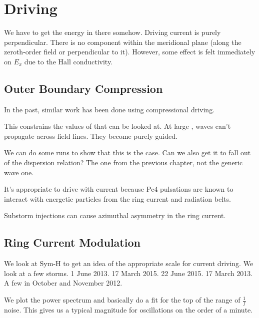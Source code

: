 \section{Driving}
  \label{sec_driving}

We have to get the energy in there somehow. Driving current is purely perpendicular. There is no component within the meridional plane (along the zeroth-order field or perpendicular to it). However, some effect is felt immediately on $E_x$ due to the Hall conductivity. 

\subsection{Outer Boundary Compression}

In the past, similar work has been done using compressional driving. 

This constrains the values of \azm that can be looked at. At large \azm, \Alfven waves can't propagate across field lines. They become purely guided. 

We can do some runs to show that this is the case. Can we also get it to fall out of the dispersion relation? The one from the previous chapter, not the generic \Alfven wave one. 

It's appropriate to drive with current because Pc4 pulsations are known to interact with energetic particles from the ring current and radiation belts. 

Substorm injections can cause azimuthal asymmetry in the ring current. 

\subsection{Ring Current Modulation}

We look at Sym-H to get an idea of the appropriate scale for current driving. We look at a few storms. 1 June 2013. 17 March 2015. 22 June 2015. 17 March 2013. A few in October and November 2012. 

We plot the power spectrum and basically do a fit for the top of the range of $\frac{1}{f}$ noise. This gives us a typical magnitude for oscillations on the order of a minute. 

